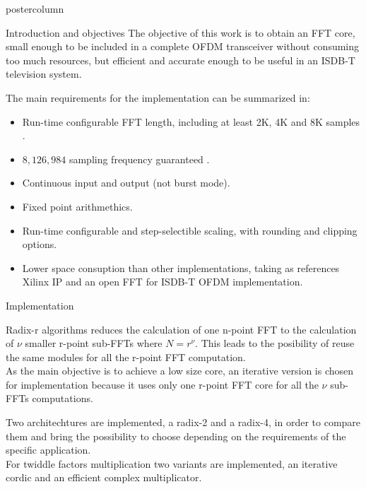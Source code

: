 \documentclass[final]{beamer}
\begin{document}
\begin{frame}{}
\begin{columns}
\begin{column}{.5\textwidth}
\begin{beamercolorbox}[center,wd=0.9\textwidth]{postercolumn}
\begin{minipage}[T]{.99\textwidth}
{\begin{block}{Introduction and objectives}
			The objective of this work is to obtain an FFT core, small enough to be included in a complete OFDM transceiver without consuming 
			too much resources, but efficient and accurate enough to be useful in an ISDB-T television system.
			
			The main requirements for the implementation can be summarized in:
%
			\begin{itemize}
			  \item Run-time configurable FFT length, including at least 2K, 4K and 8K samples \cite{ISDB}.
			  \item $8,126,984$ sampling frequency guaranteed \cite{ISDB}.
			  \item Continuous input and output (not burst mode).
			  \item Fixed point arithmethics.
			  \item Run-time configurable and step-selectible scaling, with rounding and clipping options.
			  \item Lower space consuption than other implementations, taking as references Xilinx IP and an open FFT for ISDB-T OFDM implementation.
			\end{itemize}
			
        \end{block}


	    \begin{block}{Implementation}
	    	\justify
	    	
			Radix-r algorithms reduces the calculation of one n-point FFT to the calculation of $\nu$ smaller r-point sub-FFTs where $N = r^\nu$. This leads to the posibility of
			reuse the same modules for all the r-point FFT computation.\\
			
			As the main objective is to achieve a low size core, an iterative version is chosen for implementation because it uses only one r-point FFT core for all the
			$\nu$ sub-FFTs computations.
			  
			Two architechtures are implemented, a radix-2 and a radix-4, in order to compare them and bring the possibility to choose
			depending on the requirements of the specific application.\\
			For twiddle factors multiplication two variants are implemented, an iterative cordic and an efficient complex multiplicator.\\
			

\end{block}}
\end{minipage}
\end{beamercolorbox}
\end{column}
\end{columns}
\end{frame}
\end{document}
